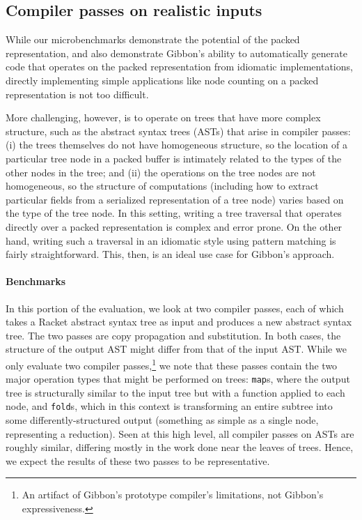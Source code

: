 \documentclass[a4paper,english]{lipics-v2016}
\newcommand{\treelang}{Gibbon\xspace} %
\begin{document}
\subsection{Compiler passes on realistic inputs} \label{sec:astbench}

While our microbenchmarks demonstrate the potential of the packed
representation, and also demonstrate \treelang{}'s ability to automatically
generate code that operates on the packed representation from idiomatic
implementations, directly implementing simple applications like node counting
on a packed representation is not too difficult.

More challenging, however, is to operate on trees that have more complex
structure, such as the abstract syntax trees (ASTs) that arise in compiler
passes: (i) the trees themselves do not have homogeneous structure, so the
location of a particular tree node in a packed buffer is intimately related to
the types of the other nodes in the tree; and (ii) the operations on the tree
nodes are not homogeneous, so the structure of computations (including how to
extract particular fields from a serialized representation of a tree node)
varies based on the type of the tree node. In this setting, writing a tree
traversal that operates directly over a packed representation is complex and
error prone. On the other hand, writing such a traversal in an idiomatic style
using pattern matching is fairly straightforward. This, then, is an ideal use
case for \treelang{}'s approach.

\paragraph*{Benchmarks}
In this portion of the evaluation, we look at two compiler passes, each of
which takes a Racket abstract syntax tree as input and produces a new abstract
syntax tree. The two passes are copy propagation and substitution. In both
cases, the structure of the output AST might differ from that of the input
AST. While we only evaluate two compiler passes,\footnote{An artifact of \treelang{}'s prototype compiler's limitations, not \treelang{}'s expressiveness.} we note that these passes contain the two major operation types that might be performed on trees: {\tt map}s, where the output tree is structurally similar to the input tree but with a function applied to each node, and {\tt fold}s, which in this context is transforming an entire subtree into some differently-structured output (something as simple as a single node, representing a reduction). Seen at this high level, all compiler passes on ASTs are roughly similar, differing mostly in the work done near the leaves of trees. Hence, we expect the results of these two passes to be representative.
\end{document}
